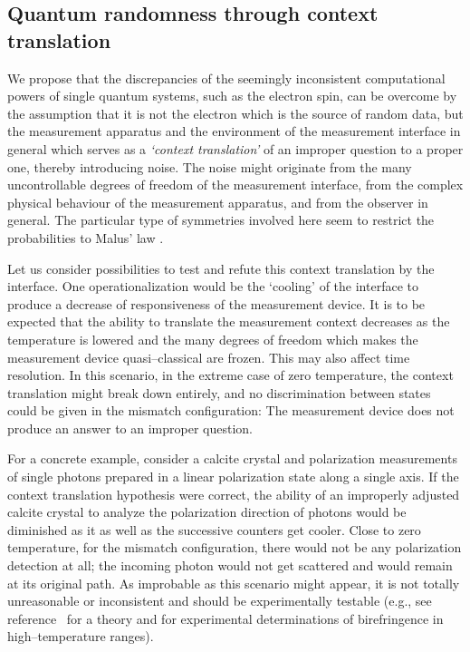 \documentclass{article}
\begin{document}
\subsection{Quantum randomness through context translation}

We propose that the discrepancies of the seemingly inconsistent computational powers
of single quantum systems, such as the electron spin,
can be overcome by the assumption that it is not the electron which is the source of random data,
but the measurement apparatus and the environment of the measurement interface in general
which serves as a {\em `context translation'} of an improper question to a proper one,
thereby introducing noise.
The noise might originate from the many uncontrollable degrees of freedom of the measurement interface,
from the complex physical behaviour of the measurement apparatus, and from the observer in general.
The particular type of symmetries involved here seem to restrict the probabilities to Malus' law \cite{zeil-bruk-99}.

Let us consider possibilities to test and refute this  context translation by the interface.
One  operationalization would be the `cooling' of the interface
to produce a decrease of responsiveness of the measurement device.
It is to be expected that the ability to translate
the measurement context decreases as the temperature is lowered
and the many degrees of freedom which makes the measurement device quasi--classical are frozen.
This may also affect time resolution.
In this scenario,
in the extreme case of zero temperature,
the context translation might break down entirely,
and no discrimination between states could be given in the mismatch configuration:
The measurement device does not produce an answer to an improper question.

For a concrete example, consider a calcite crystal and polarization measurements of single photons
prepared in a linear polarization state along a single axis. If the  context translation hypothesis
were correct, the ability of an improperly adjusted calcite crystal to analyze the polarization direction of
photons would be diminished as it as well as the successive counters get cooler.
Close to zero temperature, for the mismatch configuration, there would not be any
polarization detection at all; the incoming photon would not get scattered and would remain at its original path.
As improbable as this scenario might appear, it is not totally unreasonable or inconsistent and should be
experimentally testable (e.g., see reference~\cite{Chaib-0953-8984-12-10-316} for a theory and
\cite{Herreros-Cedres:ks0116,kim-02} for experimental determinations of birefringence
in high--temperature ranges).
\end{document}
